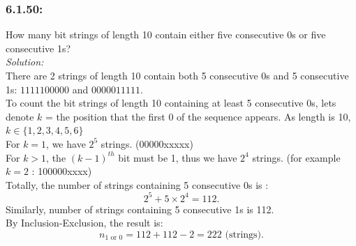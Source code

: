 \documentclass[a4paper]{article}
\begin{document}
	\subsubsection*{6.1.50:} How many bit strings of length 10 contain either five consecutive 0s or five consecutive 1s?\\
	\textit{Solution:} \\
	There are 2 strings of length 10 contain both 5 consecutive 0s and 5 consecutive 1s: $1111100000$ and $0000011111$.\\
    To count the bit strings of length 10 containing at least 5 consecutive 0s, lets denote $k$ = the position that the first 0 of the sequence appears. As length is 10, $k \in \{1,2,3,4,5,6\}$ \\
    For $k = 1$, we have $2^{5}$ strings. (00000xxxxx) \\
    For $k > 1$, the $(k-1)^{th}$ bit must be 1, thus we have $2^{4}$ strings. (for example $k=2$ : 100000xxxx) \\
    Totally, the number of strings containing 5 consecutive 0s is : 
    \begin{equation*}
        2^{5} + 5\times 2^{4} = 112.
    \end{equation*}
    Similarly, number of strings containing 5 consecutive 1s is 112.\\
	By Inclusion-Exclusion, the result is:
	\begin{equation*}
	    n_{1 \text{ or } 0} = 112 + 112 - 2 = 222 \text{ (strings).}
	\end{equation*}
\end{document}
